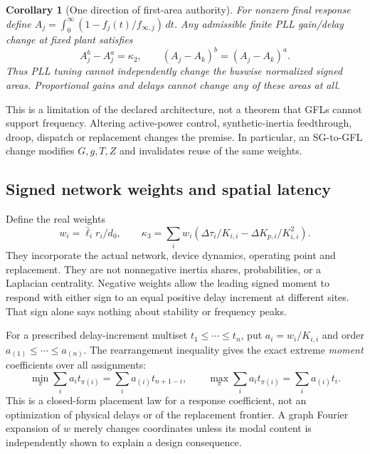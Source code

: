\documentclass[11pt]{article}
\newtheorem{corollary}[theorem]{Corollary}
\begin{document}
\begin{corollary}[One direction of first-area authority]
For nonzero final response define
$A_j=\int_0^\infty(1-f_j(t)/f_{\infty,j})\,dt$.
Any admissible finite PLL gain/delay change at fixed plant satisfies
\[
 A_j^b-A_j^a=\kappa_2,\qquad
 (A_j-A_k)^b=(A_j-A_k)^a.
\]
Thus PLL tuning cannot independently change the buswise normalized signed
areas. Proportional gains and delays cannot change any of these areas at all.
\end{corollary}
This is a limitation of the declared architecture, not a theorem that GFLs
cannot support frequency. Altering active-power control, synthetic-inertia
feedthrough, droop, dispatch or replacement changes the premise. In particular,
an SG-to-GFL change modifies $G,g,T,Z$ and invalidates reuse of the same weights.

\subsection{Signed network weights and spatial latency}
Define the real weights
\begin{equation}
 w_i=\bar\ell_i r_i/d_0,\qquad
 \kappa_3=\sum_iw_i\left(\Delta\tau_i/K_{i,i}
                          -\Delta K_{p,i}/K_{i,i}^2\right).
 \label{eq:networkweights}
\end{equation}
They incorporate the actual network, device dynamics, operating point and
replacement. They are not nonnegative inertia shares, probabilities, or a
Laplacian centrality. Negative weights allow the leading signed moment to
respond with either sign to an equal positive delay increment at different
sites. That sign alone says nothing about stability or frequency peaks.

For a prescribed delay-increment multiset $t_1\le\cdots\le t_n$, put
$a_i=w_i/K_{i,i}$ and order $a_{(1)}\le\cdots\le a_{(n)}$.
The rearrangement inequality gives the exact extreme \emph{moment} coefficients
over all assignments:
\[
 \min_\pi\sum_i a_it_{\pi(i)}=\sum_i a_{(i)}t_{n+1-i},\qquad
 \max_\pi\sum_i a_it_{\pi(i)}=\sum_i a_{(i)}t_i.
\]
This is a closed-form placement law for a response coefficient, not an
optimization of physical delays or of the replacement frontier. A graph
Fourier expansion of $w$ merely changes coordinates unless its modal content
is independently shown to explain a design consequence.
\end{document}
